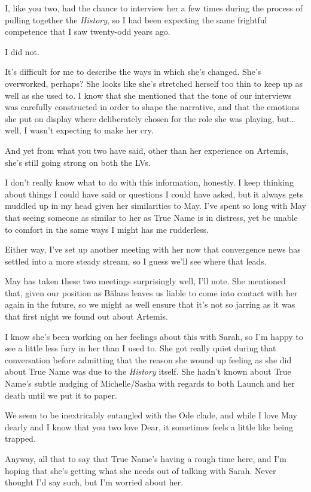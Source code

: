 I, like you two, had the chance to interview her a few times during the process of pulling together the \emph{History}, so I had been expecting the same frightful competence that I saw twenty-odd years ago.

I did not.

It's difficult for me to describe the ways in which she's changed. She's overworked, perhaps? She looks like she's stretched herself too thin to keep up as well as she used to. I know that she mentioned that the tone of our interviews was carefully constructed in order to shape the narrative, and that the emotions she put on display where deliberately chosen for the role she was playing, but\ldots well, I wasn't expecting to make her cry.

And yet from what you two have said, other than her experience on Artemis, she's still going strong on both the LVs.

I don't really know what to do with this information, honestly. I keep thinking about things I could have said or questions I could have asked, but it always gets muddled up in my head given her similarities to May. I've spent so long with May that seeing someone as similar to her as True Name is in distress, yet be unable to comfort in the same ways I might has me rudderless.

Either way, I've set up another meeting with her now that convergence news has settled into a more steady stream, so I guess we'll see where that leads.

May has taken these two meetings surprisingly well, I'll note. She mentioned that, given our position as Bălans leaves us liable to come into contact with her again in the future, so we might as well ensure that it's not so jarring as it was that first night we found out about Artemis.

I know she's been working on her feelings about this with Sarah, so I'm happy to see a little less fury in her than I used to. She got really quiet during that conversation before admitting that the reason she wound up feeling as she did about True Name was due to the \emph{History} itself. She hadn't known about True Name's subtle nudging of Michelle/Sasha with regards to both Launch and her death until we put it to paper.

We seem to be inextricably entangled with the Ode clade, and while I love May dearly and I know that you two love Dear, it sometimes feels a little like being trapped.

Anyway, all that to say that True Name's having a rough time here, and I'm hoping that she's getting what she needs out of talking with Sarah. Never thought I'd say such, but I'm worried about her.

